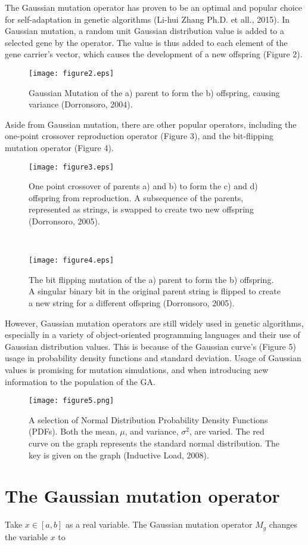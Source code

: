 \documentclass{JMLFS}
\begin{document}
The Gaussian mutation operator has proven to be an optimal and popular choice for self-adaptation in genetic algorithms (Li-hui Zhang Ph.D. et all., 2015). In Gaussian mutation, a random unit Gaussian distribution value is added to a selected gene by the operator. The value is thus added to each element of the gene carrier's vector, which causes the development of a new offspring (Figure 2). 
\begin{figure}[ht]
\centering
\texttt{[image: figure2.eps]}
\caption{Gaussian Mutation of the a) parent to form the b) offspring, causing variance (Dorronsoro, 2004).}
\end{figure} Aside from Gaussian mutation, there are other popular operators, including the one-point crossover reproduction operator (Figure 3), and the bit-flipping mutation operator (Figure 4).
\begin{figure}[ht]
\centering
\texttt{[image: figure3.eps]}
\caption{One point crossover of parents a) and b) to form the c) and d) offspring from reproduction. A subsequence of the parents, represented as strings, is swapped to create two new offspring (Dorronsoro, 2005).
}
\


\centering
\texttt{[image: figure4.eps]}
\caption{The bit flipping mutation of the a) parent to form the b) offspring. A singular binary bit in the original parent string is flipped to create a new string for a different offspring (Dorronsoro, 2005).}
\end{figure}
However, Gaussian mutation operators are still widely used in genetic algorithms, especially in a variety of object-oriented programming languages and their use of Gaussian distribution values. This is because of the Gaussian curve's (Figure 5) usage in probability density functions and standard deviation. Usage of Gaussian values is promising for mutation simulations, and when introducing new information to the population of the GA.
\begin{figure}
\centering
\texttt{[image: figure5.png]}
\caption{A selection of Normal Distribution Probability Density Functions (PDFs). Both the mean, $\mu$, and variance, $\sigma^2$, are varied. The red curve on the graph represents the standard normal distribution. The key is given on the graph (Inductive Load, 2008).}
\end{figure}

\section{{The Gaussian mutation operator}}
Take $x \in [a, b]$ as a real variable. The Gaussian mutation operator $M_g$ changes the variable $x$ to 
\end{document}

